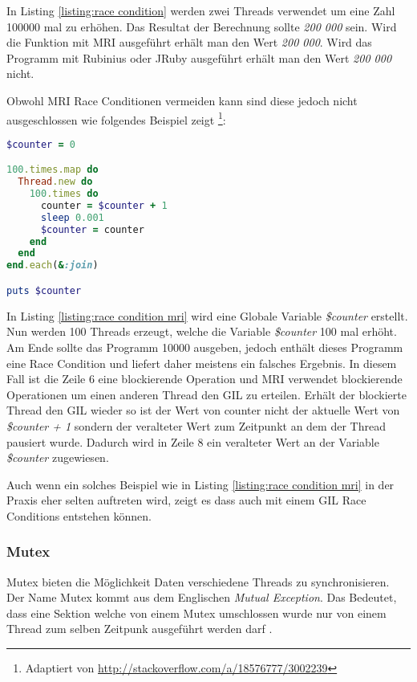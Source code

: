 In Listing \ref{listing:race condition} werden zwei Threads verwendet um eine Zahl 100000 mal zu erhöhen. Das Resultat der Berechnung sollte \emph{200 000} sein. Wird die Funktion mit MRI ausgeführt erhält man den Wert \emph{200 000}. Wird das Programm mit Rubinius oder JRuby ausgeführt erhält man den Wert \emph{200 000} nicht. 

Obwohl MRI Race Conditionen vermeiden kann sind diese jedoch nicht ausgeschlossen wie folgendes Beispiel zeigt \footnote{Adaptiert von \url{http://stackoverflow.com/a/18576777/3002239}}:

\begin{lstlisting}[language=Ruby,label={listing:race condition mri},caption={Race Condition in Ruby MRI}]
$counter = 0

100.times.map do
  Thread.new do
    100.times do
      counter = $counter + 1
      sleep 0.001
      $counter = counter
    end
  end
end.each(&:join)

puts $counter 

\end{lstlisting}

In Listing \ref{listing:race condition mri} wird eine Globale Variable \emph{\$counter} erstellt. Nun werden 100 Threads erzeugt, welche die Variable \emph{\$counter} 100 mal erhöht. Am Ende sollte das Programm 10000 ausgeben, jedoch enthält dieses Programm eine Race Condition und liefert daher meistens ein falsches Ergebnis. In diesem Fall ist die Zeile 6 eine blockierende Operation und MRI verwendet blockierende Operationen um einen anderen Thread den GIL zu erteilen. Erhält der blockierte Thread den GIL wieder so ist der Wert von counter nicht der aktuelle Wert von  \emph{\$counter + 1} sondern der veralteter Wert zum Zeitpunkt an dem der Thread pausiert wurde. Dadurch wird in Zeile 8 ein veralteter Wert an der Variable \emph{\$counter} zugewiesen. 

Auch wenn ein solches Beispiel wie in Listing \ref{listing:race condition mri} in der Praxis eher selten auftreten wird, zeigt es dass auch mit einem GIL Race Conditions entstehen können.


\subsubsection{Mutex}
Mutex bieten die Möglichkeit Daten verschiedene Threads zu synchronisieren. Der Name Mutex kommt aus dem Englischen \emph{Mutual Exception}. Das Bedeutet, dass eine Sektion welche von einem Mutex umschlossen wurde nur von einem Thread zum selben Zeitpunk ausgeführt werden darf \cite[p. 81]{Sto2013}. 

